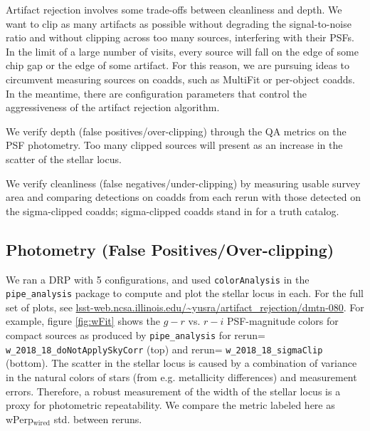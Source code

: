 \documentclass[DM,authoryear,toc]{lsstdoc}
\begin{document}
Artifact rejection involves some trade-offs between cleanliness and depth.
We want to clip as many artifacts as possible  without degrading the signal-to-noise ratio and without clipping across too many sources, interfering with their PSFs.
In the limit of a large number of visits,   every source will fall on the edge of some chip gap or the edge of some artifact. For this reason, we are pursuing ideas to circumvent measuring sources on coadds, such as MultiFit or per-object coadds.
In the meantime, there are configuration parameters that control the aggressiveness of the artifact rejection algorithm.

We verify depth (false positives/over-clipping) through the QA metrics on the PSF photometry.
Too many clipped sources will present as an increase in the scatter of the stellar locus.

We verify cleanliness (false negatives/under-clipping) by measuring usable survey area and comparing detections on coadds from each rerun with those detected on the sigma-clipped coadds; sigma-clipped coadds stand in for a truth catalog.


\subsection{Photometry (False Positives/Over-clipping)}

We ran a DRP with 5 configurations, and used \texttt{colorAnalysis} in the  \texttt{pipe\_analysis} package to compute and plot the stellar locus in each. For the full set of plots, see \url{lsst-web.ncsa.illinois.edu/~yusra/artifact_rejection/dmtn-080}.
For example, figure \ref{fig:wFit} shows the $g-r$ vs. $r-i$ PSF-magnitude colors for compact sources as produced by  \texttt{pipe\_analysis} for  rerun= \texttt{w\_2018\_18\_doNotApplySkyCorr} (top) and rerun= \texttt{w\_2018\_18\_sigmaClip} (bottom).
The scatter in the stellar locus is caused by a combination of variance in the natural colors of stars (from e.g. metallicity differences) and measurement errors.
Therefore, a robust measurement of the width of the stellar locus is a proxy for photometric repeatability.
We compare the metric labeled here as wPerp$_\mathrm{wired}$ std. between reruns.
\end{document}
